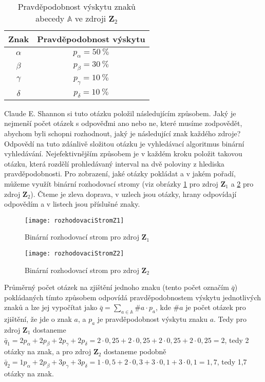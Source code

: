 \begin{table}[!htb]
\centering
\begin{tabular}{|c|c|}
\hline
Znak & Pravděpodobnost výskytu\\
\hline
$\alpha$ & $p_\alpha = 50\ \%$\\
$\beta$ & $p_\beta = 30\ \%$\\
$\gamma$ & $p_\gamma = 10\ \%$\\
$\delta$ & $p_\delta = 10\ \%$\\
\hline
\end{tabular}
\caption{Pravděpodobnost výskytu znaků abecedy $\mathbb{A}$ ve zdroji $\mathbf{Z}_2$}
\label{pstVyskytu}
\end{table}

Claude E. Shannon si tuto otázku položil následujícím způsobem. Jaký je nejmenší počet otázek s odpověďmi ano nebo ne, které musíme zodpovědět, abychom byli schopni rozhodnout, jaký je následující znak každého zdroje? Odpovědí na tuto zdánlivě složitou otázku je vyhledávací algoritmus binární vyhledávání. Nejefektivnějším způsobem je v každém kroku položit takovou otázku, která rozdělí prohledávaný interval na dvě poloviny z hlediska pravděpodobnosti. Pro zobrazení, jaké otázky pokládat a v jakém pořadí, můžeme využít binární rozhodovací stromy (viz obrázky \ref{rozhodovaciStromZ1} pro zdroj $\mathbf{Z}_1$ a \ref{rozhodovaciStromZ2} pro zdroj $\mathbf{Z}_2$). Čteme je zleva doprava, v uzlech jsou otázky, hrany odpovídají odpovědím a v listech jsou příslušné znaky.

\begin{figure}[!htb]
\centering
\texttt{[image: rozhodovaciStromZ1]}
\caption{Binární rozhodovací strom pro zdroj $\mathbf{Z}_1$}
\label{rozhodovaciStromZ1}
\end{figure}

\begin{figure}[!htb]
\centering
\texttt{[image: rozhodovaciStromZ2]}
\caption{Binární rozhodovací strom pro zdroj $\mathbf{Z}_2$}
\label{rozhodovaciStromZ2}
\end{figure}

Průměrný počet otázek na zjištění jednoho znaku (tento počet označím $\bar{q}$) pokládaných tímto způsobem odpovídá pravděpodobnostem výskytu jednotlivých znaků a lze jej vypočítat jako $\bar{q} = \sum_{a \in \mathbb{A}} \#a \cdot p_a$, kde $\#a$ je počet otázek pro zjištění, že jde o znak $a$, a $p_a$ je pravděpodobnost výskytu znaku $a$. Tedy pro zdroj $\mathbf{Z}_1$ dostaneme $\bar{q}_1 = 2p_\alpha + 2p_\beta + 2p_\gamma + 2p_\delta =2\cdot0,25 + 2\cdot0,25 + 2\cdot0,25 + 2\cdot0,25 = 2$, tedy 2 otázky na znak, a pro zdroj $\mathbf{Z}_2$ dostaneme podobně $\bar{q}_2 = 1p_\alpha + 2p_\beta + 3p_\gamma + 3p_\delta =1\cdot0,5 + 2\cdot0,3 + 3\cdot0,1 + 3\cdot0,1 = 1,7$, tedy 1,7 otázky na znak.

